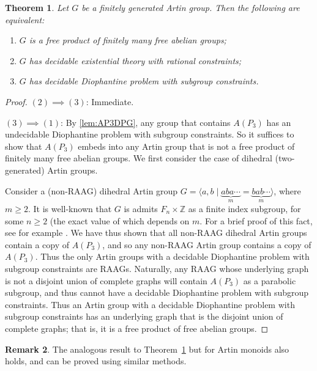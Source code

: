 \documentclass[11pt]{amsart}
\newtheorem{theorem}{Theorem}[section]
\theoremstyle{definition}
\newtheorem{rmk}[theorem]{Remark}
\numberwithin{theorem}{section}
\begin{document}
\begin{theorem}\label{thm:ArtinGroup}
Let \(G\) be a finitely generated Artin group. Then the following are equivalent:
    \begin{enumerate}
      \item \(G\) is a free product of finitely many free abelian groups;
      \item \(G\) has decidable existential theory with rational constraints;
      \item \(G\) has decidable Diophantine problem with subgroup constraints.
  \end{enumerate} 
  \end{theorem}
\begin{proof} 
	\((2) \implies (3)\): Immediate.

	\((3) \implies (1)\): By \cref{lem:AP3DPG}, any group that contains \(A(P_3)\)
	has an undecidable Diophantine problem with subgroup constraints. So it
	suffices to show that \(A(P_3)\) embeds into any Artin group that is not a
	free product of finitely many free abelian groups. We first consider the
	case of dihedral (two-generated) Artin groups. 

	Consider a (non-RAAG) dihedral Artin group \(G = \langle a, b \mid
	\underbrace{aba \cdots}_{m} = \underbrace{bab \cdots}_m \rangle\), where
	\(m \geq 2\). It is well-known that \(G\) is admits \(F_n \times
	\mathbb{Z}\) as a finite index subgroup, for some \(n \geq 2\) (the exact
	value of which depends on \(m\). For a brief proof of this fact, see for
	example \cite[Section 2]{CiobanuHoltRees}. We have thus shown that all
	non-RAAG dihedral Artin groups contain a copy of \(A(P_3)\), and so any
	non-RAAG Artin group contains a copy of \(A(P_3)\). Thus the only Artin
	groups with a decidable Diophantine problem with subgroup constraints are
	RAAGs. Naturally, any RAAG whose underlying graph is not a disjoint union
	of complete graphs will contain \(A(P_3)\) as a parabolic subgroup, and
	thus cannot have a decidable Diophantine problem with subgroup constraints.
	Thus an Artin group with a decidable Diophantine problem with subgroup
	constraints has an underlying graph that is the disjoint union of
	complete graphs; that is, it is a free product of free abelian groups.
\end{proof}

\begin{rmk} 
The analogous result to Theorem~\ref{thm:ArtinGroup} but for Artin monoids also holds, and can be proved using similar methods.  
  \end{rmk}
\end{document}
